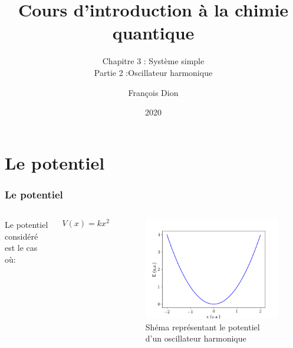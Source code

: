 \documentclass[aspectratio=169]{beamer}
\title{Cours d'introduction à la chimie quantique}
\subtitle{Chapitre 3 : Système simple\\Partie 2 :Oscillateur harmonique}
\author{François Dion}
\date{2020}
\begin{document}
\frame{\titlepage}




\section{Le potentiel}
\begin{frame}
\frametitle{Le potentiel}
\begin{columns}
Le potentiel considéré est le cas où:


\begin{equation} \tag{1}
V(x)=kx^2
\end{equation} 
\begin{figure}
\includegraphics[scale=0.4]{Pot}
\caption{Shéma représentant le potentiel d'un oscillateur harmonique}
\end{figure}


\end{columns}
\end{frame}
\end{document}
